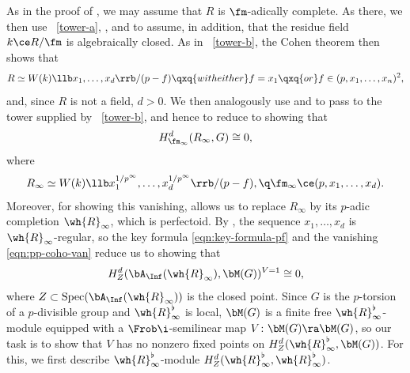 As in the proof of , we may assume that $R$ is $\fm$-adically complete. As there, we then use ~\ref{tower-a}, , and  to assume, in addition, that the residue field $k \ce R/\fm$ is algebraically closed. As in ~\ref{tower-b}, the Cohen theorem then shows that
\[
R \simeq W(k)\llb x_1, \dotsc, x_d\rrb/(p - f) \qxq{with either} f = x_1 \qxq{or} f \in (p, x_1, \dotsc, x_n)^2,
\]
and, since $R$ is not a field, $d > 0$. We then analogously use  and  to pass to the tower supplied by ~\ref{tower-b}, and hence to reduce to showing that
\[
H^d_{\fm_\infty}(R_\infty, G) \cong 0,
\]
where
\[
R_\infty \simeq W(k)\llb x_1^{1/p^\infty}, \dotsc, x_d^{1/p^\infty}\rrb/(p - f), \q \fm_\infty \ce (p, x_1, \dotsc, x_d).
\]
Moreover, for showing this vanishing,  allows us to replace $R_\infty$ by its $p$-adic completion $\wh{R}_\infty$, which is perfectoid. By , the sequence $x_1, \dotsc, x_d$ is $\wh{R}_\infty$-regular, so the key formula \eqref{eqn:key-formula-pf} and the vanishing \eqref{eqn:pp-coho-van} reduce us to showing that
\[
H^d_{Z}(\bA_\Inf(\wh{R}_\infty), \bM(G))^{V = 1} \cong 0,
\]
where $Z \subset \Spec(\bA_\Inf(\wh{R}_\infty))$ is the closed point. Since $G$ is the $p$-torsion of a $p$-divisible group and $\wh{R}_\infty^\flat$ is local, $\bM(G)$ is a finite free $\wh{R}_\infty^\flat$-module equipped with a $\Frob\i$-semilinear map $V \colon \bM(G) \ra \bM(G)$, so our task is to show that $V$ has no nonzero fixed points on $H^d_{Z}(\wh{R}_\infty^\flat, \bM(G))$. For this, we first describe $\wh{R}_\infty^\flat$-module $H^d_Z(\wh{R}_\infty^\flat, \wh{R}_\infty^\flat)$.


